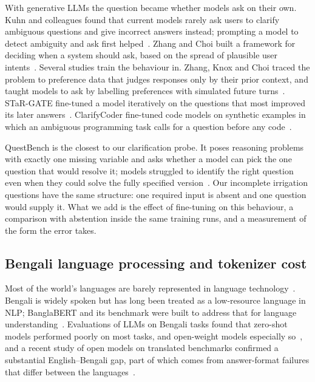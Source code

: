 With generative LLMs the question became whether models ask on their own. Kuhn and colleagues found that current models rarely ask users to clarify ambiguous questions and give incorrect answers instead; prompting a model to detect ambiguity and ask first helped~\cite{kuhn2022clam}. Zhang and Choi built a framework for deciding when a system should ask, based on the spread of plausible user intents~\cite{zhang2025clarify}. Several studies train the behaviour in. Zhang, Knox and Choi traced the problem to preference data that judges responses only by their prior context, and taught models to ask by labelling preferences with simulated future turns~\cite{zhang2024modeling}. STaR-GATE fine-tuned a model iteratively on the questions that most improved its later answers~\cite{andukuri2024stargate}. ClarifyCoder fine-tuned code models on synthetic examples in which an ambiguous programming task calls for a question before any code~\cite{wu2025clarifycoder}.

QuestBench is the closest to our clarification probe. It poses reasoning problems with exactly one missing variable and asks whether a model can pick the one question that would resolve it; models struggled to identify the right question even when they could solve the fully specified version~\cite{li2025questbench}. Our incomplete irrigation questions have the same structure: one required input is absent and one question would supply it. What we add is the effect of fine-tuning on this behaviour, a comparison with abstention inside the same training runs, and a measurement of the form the error takes.

\subsection{Bengali language processing and tokenizer cost}
\label{sec:rev-bengali}

Most of the world's languages are barely represented in language technology~\cite{joshi2020state}. Bengali is widely spoken but has long been treated as a low-resource language in NLP; BanglaBERT and its benchmark were built to address that for language understanding~\cite{bhattacharjee2022banglabert}. Evaluations of LLMs on Bengali tasks found that zero-shot models performed poorly on most tasks, and open-weight models especially so~\cite{kabir2024benllmeval}, and a recent study of open models on translated benchmarks confirmed a substantial English--Bengali gap, part of which comes from answer-format failures that differ between the languages~\cite{bhowmik2025script}.

